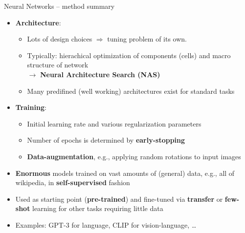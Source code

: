 \begin{frame}{Neural Networks -- method summary}

\footnotesize



\begin{itemize}
  \item \textbf{Architecture}:
  \begin{itemize}
    \item Lots of design choices $\Rightarrow$ tuning problem of its own.
    \item Typically: hierachical optimization of components (cells) and macro structure of network\\ 
    $\rightarrow$ \textbf{Neural Architecture Search (NAS)}
    \item Many predifined (well working) architectures exist for standard tasks
  \end{itemize}
  \item \textbf{Training}:
  \begin{itemize}
    \item Initial learning rate and various regularization parameters
    \item Number of epochs is determined by \textbf{early-stopping}
    \item \textbf{Data-augmentation}, e.g., applying random rotations to input images
  \end{itemize}
\end{itemize}

\medskip


\begin{itemize}
    \item \textbf{Enormous} models trained on vast amounts of (general) data, e.g., all of wikipedia, in \textbf{self-supervised} fashion
    \item Used as starting point (\textbf{pre-trained}) and fine-tuned via \textbf{transfer} or \textbf{few-shot} learning for other tasks requiring little data
    \item Examples: GPT-3 for language, CLIP for vision-language, \dots
\end{itemize}


\end{frame}
